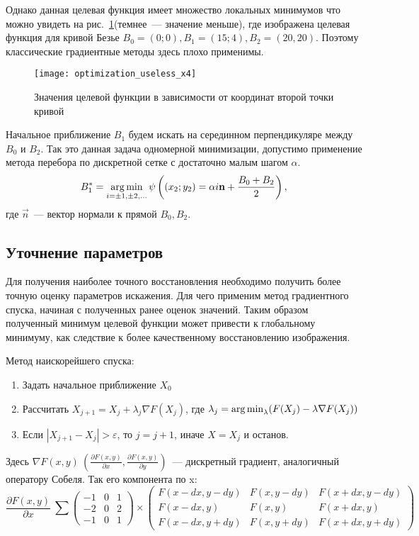 Однако данная целевая функция имеет множество локальных минимумов что можно увидеть на рис.~\ref{fig:costFunctionGrid}(темнее~--- значение меньше), где изображена целевая функция для кривой Безье $B_0=(0;0), B_1=(15;4), B_2=(20, 20)$. Поэтому классические градиентные методы здесь плохо применимы.
\begin{figure}[h!]
	\centering\texttt{[image: optimization\_useless\_x4]}
	\caption{Значения целевой функции в зависимости от координат второй точки кривой}
	\label{fig:costFunctionGrid}
\end{figure}
Начальное приближение $B_1$ будем искать на серединном перпендикуляре между $B_0$ и $B_2$. Так это данная задача одномерной минимизации, допустимо применение метода перебора по дискретной сетке с достаточно малым шагом $\alpha$.
\begin{equation}
	B_1^* = \operatorname*{arg\,min}_{i = \pm 1, \pm 2, \dots}\psi\left((x_2;y_2)= \alpha i \mathbf{n}+\frac{B_0+B_2}{2}\right),
\end{equation}
где $\vec{n}$~--- вектор нормали к прямой $B_0,B_2$.

\subsection{Уточнение параметров}
Для получения наиболее точного восстановления необходимо получить более точную оценку параметров искажения. Для чего применим метод градиентного спуска, начиная с полученных ранее оценок значений. Таким образом полученный минимум целевой функции может привести к глобальному минимуму, как следствие к более качественному восстановлению изображения.

Метод наискорейшего спуска:
\begin{enumerate}
	\item Задать начальное приближение $X_0$
	\item Рассчитать $X_{j+1} = X_j + \lambda_j \nabla F(X_j)$, где $\lambda_j = \operatorname*{arg\,min}_\lambda (F(X_j) - \lambda\nabla F(X_j))$
	\item Если $|X_{j+1}-X_j| > \varepsilon$, то $j = j+1$, иначе $X = X_j$ и останов.
\end{enumerate}
Здесь $\nabla F(x,y)~\left(\frac{\partial F(x,y)}{\partial x}, \frac{\partial F(x,y)}{\partial y}\right)$~--- дискретный градиент, аналогичный оператору Собеля. Так его компонента по x:
\begin{equation*}
	\frac{\partial F(x,y)}{\partial x} ~ \sum
	\begin{pmatrix}
		-1 & 0 & 1\\
		-2 & 0 & 2\\
		-1 & 0 & 1
	\end{pmatrix} \times \begin{pmatrix}
		F(x-dx, y-dy) & F(x, y-dy) & F(x+dx, y-dy)\\
		F(x-dx, y) & F(x, y) & F(x+dx, y)\\
		F(x-dx, y+dy) & F(x, y+dy) & F(x+dx, y+dy)
	\end{pmatrix}
\end{equation*}

